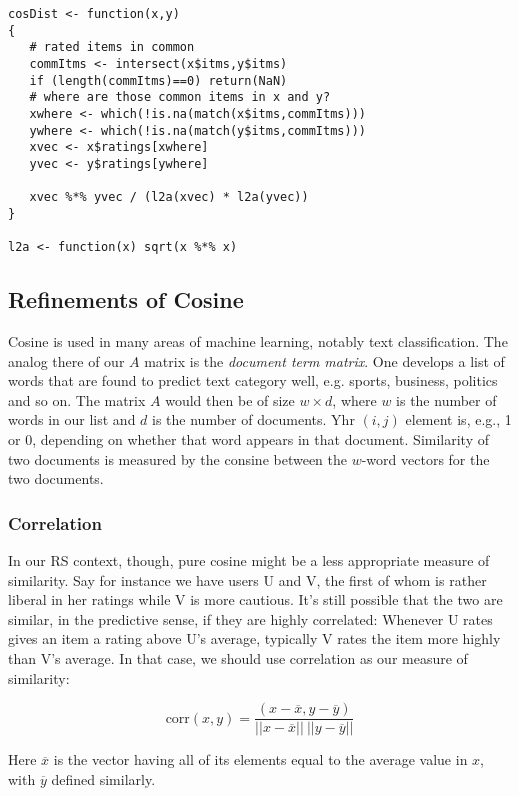 \begin{lstlisting}
cosDist <- function(x,y)
{
   # rated items in common
   commItms <- intersect(x$itms,y$itms)
   if (length(commItms)==0) return(NaN)
   # where are those common items in x and y?
   xwhere <- which(!is.na(match(x$itms,commItms)))
   ywhere <- which(!is.na(match(y$itms,commItms)))
   xvec <- x$ratings[xwhere]
   yvec <- y$ratings[ywhere]

   xvec %*% yvec / (l2a(xvec) * l2a(yvec))
}

l2a <- function(x) sqrt(x %*% x)

\end{lstlisting}

\subsection{Refinements of Cosine}

Cosine is used in many areas of machine learning, notably text
classification.  The analog there of our $A$ matrix is the
\textit{document term matrix}.  One develops a list of words that are
found to predict text category well, e.g. sports, business, politics and
so on.  The matrix $A$ would then be of size $w \times d$, where $w$ is
the number of words in our list and $d$ is the number of documents.  Yhr
$(i,j)$ element is, e.g., 1 or 0, depending on whether that word appears
in that document.  Similarity of two documents is measured by the
consine between the $w$-word vectors for the two documents.
\subsubsection{Correlation}

In our RS context, though, pure cosine might be a less appropriate
measure of similarity.  Say for instance we have users U and V, the
first of whom is rather liberal in her ratings while V is more cautious.
It's still possible that the two are similar, in the predictive sense,
if they are highly correlated:  Whenever U rates gives an item a rating
above U's average, typically V rates the item more highly than V's
average.  In that case, we should use correlation as our measure of
similarity:

\begin{equation}
\textrm{corr}(x,y) =
\frac{(x-\overline{x},y-\overline{y})}
{||x-\overline{x}|| ~ ||y-\overline{y}||}
\end{equation}

Here $\overline{x}$ is the vector having all of its elements equal to
the average value in $x$, with $\overline{y}$ defined similarly.

